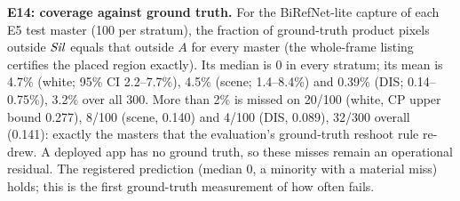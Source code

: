 \documentclass[10pt]{article}
\begin{document}
\textbf{E14: coverage against ground truth.} For the BiRefNet-lite capture of each E5 test master (100 per stratum),
the fraction of ground-truth product pixels outside $\mathit{Sil}$ equals that outside $A$ for every master (the whole-frame
listing certifies the placed region exactly). Its median is 0 in every stratum; its mean is 4.7\% (white; 95\% CI
2.2--7.7\%), 4.5\% (scene; 1.4--8.4\%) and 0.39\% (DIS; 0.14--0.75\%), 3.2\% over all 300. More than 2\% is missed on
20/100 (white, CP upper bound 0.277), 8/100 (scene, 0.140) and 4/100 (DIS, 0.089), 32/300 overall (0.141): exactly the
masters that the evaluation's ground-truth reshoot rule re-drew. A deployed app has no ground truth, so these misses
remain an operational residual. The registered prediction (median 0, a minority with a material miss) holds; this
is the first ground-truth measurement of how often  fails.
\end{document}
